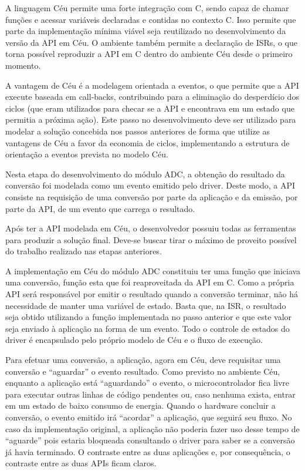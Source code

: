 \documentclass{article}
\begin{document}
\tab A linguagem Céu permite uma forte integração com C, sendo capaz de chamar funções e acessar
variáveis declaradas e contidas no contexto C. Isso permite que parte da implementação mínima
viável seja reutilizado no desenvolvimento da versão da API em Céu. O ambiente também permite a
declaração de ISRs, o que torna possível reproduzir a API em C dentro do ambiente Céu desde o
primeiro momento.
\par A vantagem de Céu é a modelagem orientada a eventos, o que permite que a API execute baseada
em call-backs, contribuindo para a eliminação do desperdício dos ciclos (que eram utilizados para
checar se a API e encontrava em um estado que permitia a próxima ação). Este passo no
desenvolvimento deve ser utilizado para modelar a solução concebida nos passos anteriores de forma
que utilize as vantagens de Céu a favor da economia de ciclos, implementando a estrutura de
orientação a eventos prevista no modelo Céu.
\par Nesta etapa do desenvolvimento do módulo ADC, a obtenção do resultado da conversão foi
modelada como um evento emitido pelo driver. Deste modo, a API consiste na requisição de uma
conversão por parte da aplicação e da emissão, por parte da API, de um evento que carrega o
resultado.
\par Após ter a API modelada em Céu, o desenvolvedor possuiu todas as ferramentas para produzir a
solução final. Deve-se buscar tirar o máximo de proveito possível do trabalho realizado nas etapas
anteriores.
\par A implementação em Céu do módulo ADC constituiu ter uma função que iniciava uma conversão,
função esta que foi reaproveitada da API em C. Como a própria API será responsável por emitir o
resultado quando a conversão terminar, não há necessidade de manter uma variável de estado. Basta
que, na ISR, o resultado seja obtido utilizando a função implementada no passo anterior e que este
valor seja enviado à aplicação na forma de um evento. Todo o controle de estados do driver é
encapsulado pelo próprio modelo de Céu e o fluxo de execução.
\par Para efetuar uma conversão, a aplicação, agora em Céu, deve requisitar uma conversão e “aguardar”
o evento resultado. Como previsto no ambiente Céu, enquanto a aplicação está “aguardando” o
evento, o microcontrolador fica livre para executar outras linhas de código pendentes ou, caso
nenhuma exista, entrar em um estado de baixo consumo de energia. Quando o hardware concluir a
conversão, o evento emitido irá “acordar” a aplicação, que seguirá seu fluxo. No caso da
implementação original, a aplicação não poderia fazer uso desse tempo de “aguarde” pois estaria
bloqueada consultando o driver para saber se a conversão já havia terminado. O contraste entre as
duas aplicações e, por consequência, o contraste entre as duas APIs ficam claros.
\end{document}
